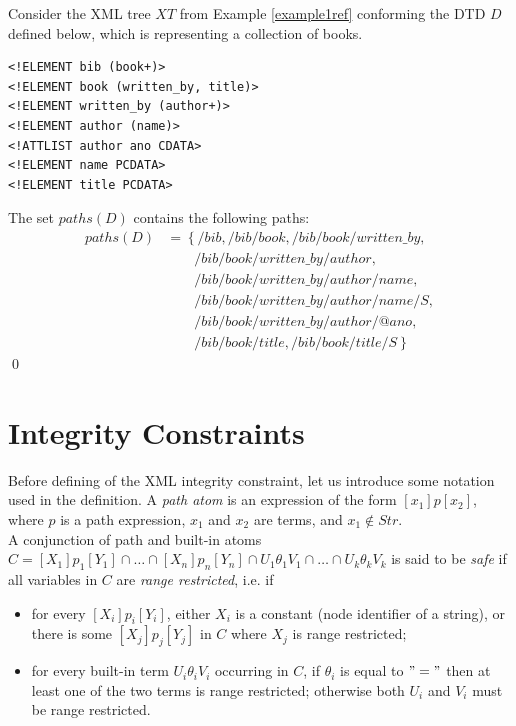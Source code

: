 \begin{example}\label{pathExample}
Consider the XML tree $XT$ from Example \ref{example1ref} conforming the DTD $D$ defined below, which is representing a collection of books.
\begin{verbatim}
<!ELEMENT bib (book+)>
<!ELEMENT book (written_by, title)>
<!ELEMENT written_by (author+)>
<!ELEMENT author (name)>
<!ATTLIST author ano CDATA>
<!ELEMENT name PCDATA>
<!ELEMENT title PCDATA>
\end{verbatim}

The set $paths(D)$ contains the following paths:
\begin{align}
paths(D) &= \left\{/bib, /bib/book, /bib/book/written\_by,\right.\nonumber\\
&\qquad \left. /bib/book/written\_by/author, \right.\nonumber\\
&\qquad \left. /bib/book/written\_by/author/name, \right.\nonumber\\
&\qquad \left. /bib/book/written\_by/author/name/S, \right.\nonumber\\
&\qquad \left. /bib/book/written\_by/author/@ano, \right.\nonumber\\
&\qquad \left. /bib/book/title, /bib/book/title/S\nonumber\right\}
\end{align}\qed
\end{example}

\section{Integrity Constraints}

Before defining of the XML integrity constraint, let us introduce some notation used in the definition. A \emph{path atom} is an expression of the form $[x_1]p[x_2]$, where $p$ is a path expression, $x_1$ and $x_2$ are terms, and $x_1 \not \in Str$.\\
A conjunction of path and built-in atoms $C = [X_1]p_1[Y_1] \cap \dots \cap [X_n]p_n[Y_n] \cap U_1\theta_1 V_1 \cap \dots \cap U_k \theta_k V_k$ is said to be \emph{safe} if all variables in $C$ are \emph{range restricted}, i.e. if
\begin{itemize}
 	\item for every $[X_i]p_i[Y_i]$, either $X_i$ is a constant (node identifier of a string), or there is some $[X_j]p_j[Y_j]$ in $C$ where $X_j$ is range restricted;
    \item for every built-in term $U_i\theta_i V_i$ occurring in $C$, if $\theta_i$ is equal to $"="$ then at least one of the two terms is range restricted; otherwise both $U_i$ and $V_i$ must be range restricted.
 \end{itemize}

